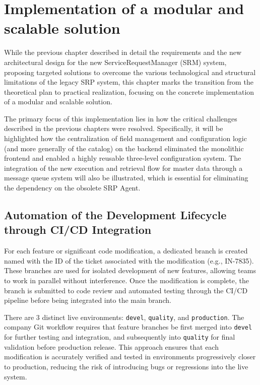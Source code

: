 \chapter{Implementation of a modular and scalable solution}
\sloppy

While the previous chapter described in detail the requirements and the new architectural design for the new ServiceRequestManager (SRM) system, proposing targeted solutions to overcome the various technological and structural limitations of the legacy SRP system, this chapter marks the transition from the theoretical plan to practical realization, focusing on the concrete implementation of a modular and scalable solution.

The primary focus of this implementation lies in how the critical challenges described in the previous chapters were resolved. Specifically, it will be highlighted how the centralization of field management and configuration logic (and more generally of the catalog) on the backend eliminated the monolithic frontend and enabled a highly reusable three-level configuration system. The integration of the new execution and retrieval flow for master data through a message queue system will also be illustrated, which is essential for eliminating the dependency on the obsolete SRP Agent.

\section{Automation of the Development Lifecycle through CI/CD Integration} \label{sec:ci_cd}

For each feature or significant code modification, a dedicated branch is created named with the ID of the ticket associated with the modification (e.g., IN-7835). These branches are used for isolated development of new features, allowing teams to work in parallel without interference. Once the modification is complete, the branch is submitted to code review and automated testing through the CI/CD pipeline before being integrated into the main branch.

There are 3 distinct live environments: \texttt{devel}, \texttt{quality}, and \texttt{production}. The company Git workflow requires that feature branches be first merged into \texttt{devel} for further testing and integration, and subsequently into \texttt{quality} for final validation before production release. This approach ensures that each modification is accurately verified and tested in environments progressively closer to production, reducing the risk of introducing bugs or regressions into the live system.

